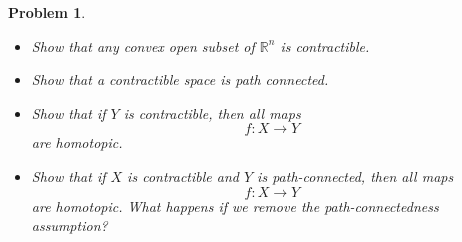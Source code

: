 \documentclass[10pt]{article}
\newcommand{\bb}[1]{\mathbb{#1}}
\theoremstyle{plain}
\newtheorem{problem}{Problem}
\theoremstyle{remark}
\begin{document}
\begin{problem} %
  \begin{itemize}
  \item[a)] Show that any convex open subset of $\bb{R}^n$ is contractible.
  \item[b)] Show that a contractible space is path connected.
  \item[c)] Show that if $Y$ is contractible, then all maps
    \[ f:X\rightarrow Y\]
    are homotopic.
  \item[d)] Show that if $X$ is contractible and $Y$ is path-connected, then all
    maps
    \[ f:X\rightarrow Y\] are homotopic. What happens if we remove the path-connectedness
    assumption?
  \end{itemize}
\end{problem}
\end{document}
